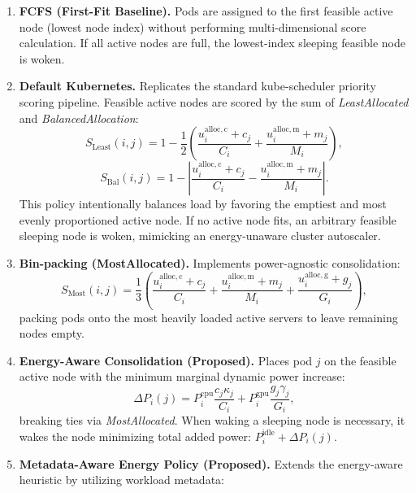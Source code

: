 \documentclass[a4paper,fleqn]{cas-dc}
\begin{document}
\begin{enumerate}[(1)]
\item \textbf{FCFS (First-Fit Baseline).} Pods are assigned to the first feasible active node (lowest node index) without performing multi-dimensional score calculation. If all active nodes are full, the lowest-index sleeping feasible node is woken.
\item \textbf{Default Kubernetes.} Replicates the standard kube-scheduler priority scoring pipeline. Feasible active nodes are scored by the sum of \emph{LeastAllocated} and \emph{BalancedAllocation}:
\begin{equation}
S_{\mathrm{Least}}(i, j) = 1 - \frac{1}{2}\left(\frac{u_i^{\mathrm{alloc,c}} + c_j}{C_i} + \frac{u_i^{\mathrm{alloc,m}} + m_j}{M_i}\right),
\end{equation}
\begin{equation}
S_{\mathrm{Bal}}(i, j) = 1 - \left|\frac{u_i^{\mathrm{alloc,c}} + c_j}{C_i} - \frac{u_i^{\mathrm{alloc,m}} + m_j}{M_i}\right|.
\end{equation}
This policy intentionally balances load by favoring the emptiest and most evenly proportioned active node. If no active node fits, an arbitrary feasible sleeping node is woken, mimicking an energy-unaware cluster autoscaler.
\item \textbf{Bin-packing (MostAllocated).} Implements power-agnostic consolidation:
\begin{equation}
S_{\mathrm{Most}}(i, j) = \frac{1}{3}\left(\frac{u_i^{\mathrm{alloc,c}} + c_j}{C_i} + \frac{u_i^{\mathrm{alloc,m}} + m_j}{M_i} + \frac{u_i^{\mathrm{alloc,g}} + g_j}{G_i}\right),
\end{equation}
packing pods onto the most heavily loaded active servers to leave remaining nodes empty.
\item \textbf{Energy-Aware Consolidation (Proposed).} Places pod $j$ on the feasible active node with the minimum marginal dynamic power increase:
\begin{equation}
\Delta P_i(j) = P_i^{\mathrm{cpu}}\frac{c_j\kappa_j}{C_i} + P_i^{\mathrm{gpu}}\frac{g_j\gamma_j}{G_i},
\label{eq:marginal}
\end{equation}
breaking ties via \emph{MostAllocated}. When waking a sleeping node is necessary, it wakes the node minimizing total added power: $P_i^{\mathrm{idle}} + \Delta P_i(j)$.
\item \textbf{Metadata-Aware Energy Policy (Proposed).} Extends the energy-aware heuristic by utilizing workload metadata:
\begin{itemize}

\end{itemize}
\end{enumerate}
\end{document}
